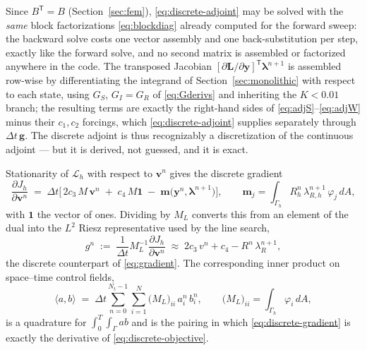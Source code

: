 \documentclass[11pt]{article}
\newcommand{\Lag}{\mathcal{L}}
\begin{document}
Since $B^{\mathsf T}=B$ (Section~\ref{sec:fem}), \eqref{eq:discrete-adjoint} may be solved with the \emph{same} block factorizations \eqref{eq:blockdiag} already computed for the forward sweep: the backward solve costs one vector assembly and one back-substitution per step, exactly like the forward solve, and no second matrix is assembled or factorized anywhere in the code. The transposed Jacobian $[\partial\mathbf{L}/\partial\mathbf{y}]^{\mathsf T}\boldsymbol\lambda^{n+1}$ is assembled row-wise by differentiating the integrand of Section~\ref{sec:monolithic} with respect to each state, using $G_S$, $G_I=G_R$ of \eqref{eq:Gderivs} and inheriting the $K<0.01$ branch; the resulting terms are exactly the right-hand sides of \eqref{eq:adjS}--\eqref{eq:adjW} minus their $c_1,c_2$ forcings, which \eqref{eq:discrete-adjoint} supplies separately through $\Delta t\,\mathbf{g}$. The discrete adjoint is thus recognizably a discretization of the continuous adjoint --- but it is derived, not guessed, and it is exact.

Stationarity of $\Lag_h$ with respect to $\mathbf{v}^n$ gives the discrete gradient
\begin{equation}
\frac{\partial J_h}{\partial \mathbf{v}^n} \;=\; \Delta t\Big[\,2c_3\,M\,\mathbf{v}^n \;+\; c_4\,M\mathbf{1} \;-\; \mathbf{m}\big(\mathbf{y}^n,\boldsymbol\lambda^{n+1}\big)\Big],
\qquad
\mathbf{m}_j = \int_{\Gamma_h} R_h^n\,\lambda_{R,h}^{n+1}\,\varphi_j\,dA ,
\label{eq:discrete-gradient}
\end{equation}
with $\mathbf{1}$ the vector of ones. Dividing by $M_L$ converts this from an element of the dual into the $L^2$ Riesz representative used by the line search,
\begin{equation}
g^n \;:=\; \frac{1}{\Delta t}M_L^{-1}\frac{\partial J_h}{\partial\mathbf{v}^n}
\;\approx\; 2c_3\,v^n + c_4 - R^n\,\lambda_R^{n+1},
\end{equation}
the discrete counterpart of \eqref{eq:gradient}. The corresponding inner product on space--time control fields,
\begin{equation}
\big\langle a, b\big\rangle \;=\; \Delta t\sum_{n=0}^{N_t-1}\sum_{i=1}^{N} \big(M_L\big)_{ii}\,a^n_i\,b^n_i,
\qquad \big(M_L\big)_{ii} = \int_{\Gamma_h}\varphi_i\,dA,
\label{eq:inner-product}
\end{equation}
is a quadrature for $\int_0^T\int_\Gamma ab$ and is the pairing in which \eqref{eq:discrete-gradient} is exactly the derivative of \eqref{eq:discrete-objective}.
\end{document}

